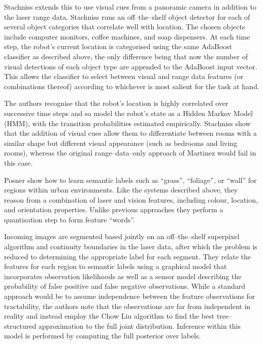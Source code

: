 Stachniss \etal \cite{Stachniss05} extends this to use visual cues
from a panoramic camera in addition to the laser range data. Stachniss
runs an off--the--shelf object detector for each of several object
categories that correlate well with location. The chosen objects
include computer monitors, coffee machines, and soap dispensers. At
each time step, the robot's current location is categorised using the
same AdaBoost classifier as described above, the only difference being
that now the number of visual detections of each object type are
appended to the AdaBoost input vector. This allows the classifier to
select between visual and range data features (or combinations
thereof) according to whichever is most salient for the task at hand.

The authors recognise that the robot's location is highly correlated
over successive time steps and so model the robot's state as a Hidden
Markov Model (HMM), with the transition probabilities estimated
empirically. Stachniss \etal show that the addition of visual cues
allow them to differentiate between rooms with a similar shape but
different visual appearance (such as bedrooms and living rooms),
whereas the original range--data--only approach of Martinez would fail
in this case.

Posner \etal \cite{Posner08} show how to learn semantic labels such as
``grass'', ``foliage'', or ``wall'' for regions within urban
environments. Like the systems described above, they reason from a
combination of laser and vision features, including colour, location,
and orientation properties. Unlike previous approaches they perform a
quantisation step to form feature ``words''.

Incoming images are segmented based jointly on an off--the--shelf
superpixel algorithm and continuity boundaries in the laser data,
after which the problem is reduced to determining the appropriate
label for each segment. They relate the features for each region to
semantic labels using a graphical model that incorporates observation
likelihoods as well as a sensor model describing the probability of
false positive and false negative observations. While a standard
approach would be to assume independence between the feature
observations for tractability, the authors note that the observations
are far from independent in reality and instead employ the Chow Liu
algorithm to find the best tree--structured approximation to the full
joint distribution. Inference within this model is performed by
computing the full posterior over labels.

